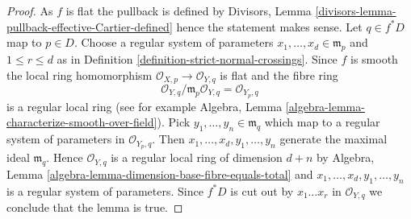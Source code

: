 \documentclass[10pt,a4paper]{amsart}
\theoremstyle{plain}
\theoremstyle{definition}
\theoremstyle{remark}
\numberwithin{equation}{subsection}
\begin{document}
\begin{proof}
As $f$ is flat the pullback is defined by
Divisors, Lemma \ref{divisors-lemma-pullback-effective-Cartier-defined}
hence the statement makes sense.
Let $q \in f^*D$ map to $p \in D$. Choose a regular system
of parameters $x_1, \ldots, x_d \in \mathfrak m_p$
and $1 \leq r \leq d$ as in
Definition \ref{definition-strict-normal-crossings}.
Since $f$ is smooth the local ring homomorphism
$\mathcal{O}_{X, p} \to \mathcal{O}_{Y, q}$ is flat
and the fibre ring
$$
\mathcal{O}_{Y, q}/\mathfrak m_p \mathcal{O}_{Y, q} =
\mathcal{O}_{Y_p, q}
$$
is a regular local ring (see for example
Algebra, Lemma \ref{algebra-lemma-characterize-smooth-over-field}).
Pick $y_1, \ldots, y_n \in \mathfrak m_q$ which map to a regular
system of parameters in $\mathcal{O}_{Y_p, q}$.
Then $x_1, \ldots, x_d, y_1, \ldots, y_n$ generate the
maximal ideal $\mathfrak m_q$. Hence $\mathcal{O}_{Y, q}$
is a regular local ring of dimension
$d + n$ by Algebra, Lemma \ref{algebra-lemma-dimension-base-fibre-equals-total}
and $x_1, \ldots, x_d, y_1, \ldots, y_n$
is a regular system of parameters. Since $f^*D$ is cut
out by $x_1 \ldots x_r$ in $\mathcal{O}_{Y, q}$ we conclude
that the lemma is true.
\end{proof}
\end{document}
